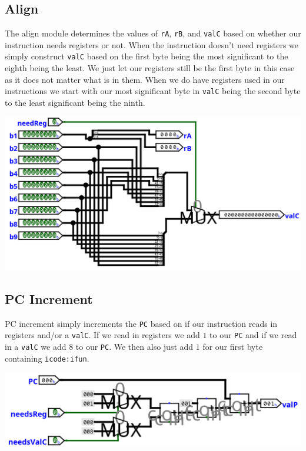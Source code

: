 \documentclass{article}
\begin{document}
\subsection{Align}
The align module determines the values of \verb+rA+, \verb+rB+, and \verb+valC+ based on whether our instruction needs registers or not. When the instruction doesn't need registers we simply construct  \verb+valC+ based on the first byte being the most significant to the eighth being the least. We just let our registers still be the first byte in this case as it does not matter what is in them. When we do have registers used in our instructions we start with our most significant byte in \verb+valC+ being the second byte to the least significant being the ninth.
\begin{center}
    \includegraphics[scale=.7]{align.png}
\end{center}
\subsection{PC Increment}
PC increment simply increments the \verb+PC+ based on if our instruction reads in registers and/or a \verb+valC+. If we read in registers we add $1$ to our \verb+PC+ and if we read in a \verb+valC+ we add $8$ to our \verb+PC+. We then also just add $1$ for our first byte containing  \verb+icode:ifun+.
\begin{center}
    \includegraphics[scale=.5]{pcInc.png}
\end{center}
\end{document}
